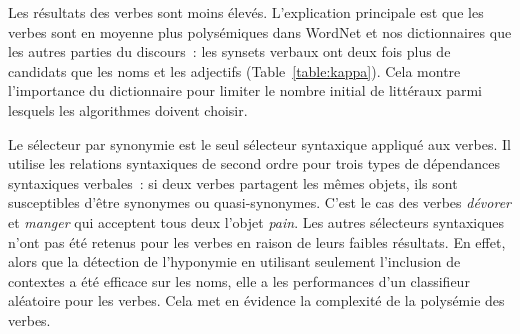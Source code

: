 
Les résultats des verbes 
sont moins élevés. L'explication principale est que les verbes sont en moyenne
plus polysémiques dans WordNet et nos dictionnaires que les autres parties du
discours~: les synsets verbaux ont deux fois plus de candidats que les noms et
les adjectifs (Table~\ref{table:kappa}). Cela montre l'importance du
dictionnaire pour limiter le nombre initial de littéraux parmi lesquels les
algorithmes doivent choisir.

Le sélecteur par synonymie est le seul sélecteur syntaxique appliqué aux
verbes. Il utilise les relations syntaxiques de second ordre pour trois types
de dépendances syntaxiques verbales~: si deux verbes partagent les mêmes
objets, ils sont susceptibles d'être synonymes ou quasi-synonymes. C'est le cas
des verbes \textit{dévorer} et \textit {manger} qui acceptent tous deux l'objet
\textit{pain}. Les autres sélecteurs syntaxiques n'ont pas été retenus pour les
verbes en raison de leurs faibles résultats. En effet, alors que la détection
de l'hyponymie en utilisant seulement l'inclusion de contextes a été efficace
sur les noms, elle a les performances d'un classifieur aléatoire pour les
verbes. Cela met en évidence la complexité de la polysémie des verbes.

